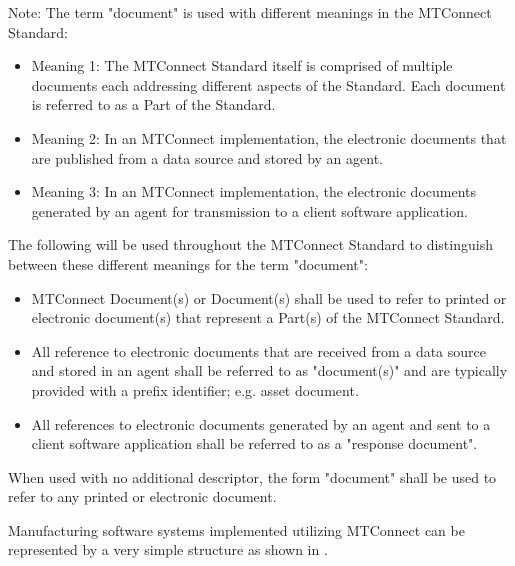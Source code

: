 \begin{note}
Note: The term "document" is used with different meanings in the MTConnect Standard:
\begin{itemize}

\item Meaning 1:  The MTConnect Standard itself is comprised of multiple documents each addressing different aspects of the Standard.  Each document is referred to as a Part of the Standard.

\item Meaning 2:  In an MTConnect implementation, the electronic documents that are published from a data source and stored by an \gls{agent}.     

\item Meaning 3:  In an MTConnect implementation, the electronic documents generated by an \gls{agent} for transmission to a client software application. 
\end{itemize}

The following will be used throughout the MTConnect Standard to distinguish between these different meanings for the term "document":

\begin{itemize}

\item MTConnect Document(s) or Document(s) shall be used to refer to printed or electronic document(s) that represent a Part(s) of the MTConnect Standard.  

\item All reference to electronic documents that are received from a data source and stored in an \gls{agent} shall be referred to as "\gls{document}(s)" and are typically provided with a prefix identifier; e.g. \gls{asset document}.

\item All references to electronic documents generated by an \gls{agent} and sent to a client software application shall be referred to as a "\gls{response document}".  
\end{itemize}

When used with no additional descriptor, the form "document" shall be used to refer to any printed or electronic document.
\end{note}

Manufacturing software systems implemented utilizing MTConnect can be represented by a very simple structure as shown in .

